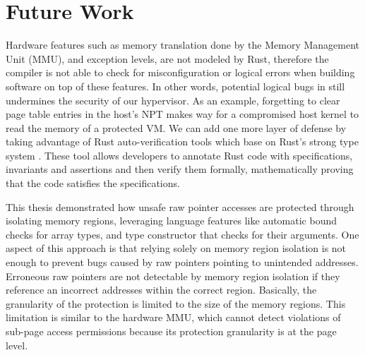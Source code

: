 \section{Future Work}
\label{sec:fw}

Hardware features such as memory translation done by the Memory Management
Unit (MMU), and exception levels, are not modeled by Rust, therefore the
compiler is not able to check for misconfiguration or logical errors when
building software on top of these features.
In other words, potential logical bugs in \rustcore{} still undermines the
security of our hypervisor.
As an example, forgetting to clear page table entries in the host's NPT
makes way for a compromised host kernel to read the memory of a protected VM.
We can add one more layer of defense by taking advantage of Rust
auto-verification tools which base on Rust's strong type system
\cite{Verus, Prusti, Creusot, Flux}. These tool allows developers to annotate
Rust code with specifications, invariants and assertions and then verify them
formally, mathematically proving that the code satisfies the specifications.

This thesis demonstrated how unsafe raw pointer accesses are protected through
isolating memory regions,
leveraging language features like automatic bound checks for array types, and
type constructor that checks for their arguments.
One aspect of this approach is that
relying solely on memory region isolation is not enough to prevent bugs caused
by raw pointers pointing to unintended addresses.
Erroneous raw pointers are not detectable by memory region isolation if they
reference an incorrect addresses within the correct region.
Basically, the granularity of the protection is limited to the size of the
memory regions. This limitation is similar to the hardware MMU, which cannot
detect violations of sub-page access permissions because its protection
granularity is at the page level.

